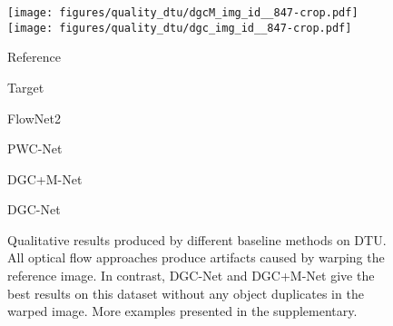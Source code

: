 \documentclass[10pt,twocolumn,letterpaper]{article}
\newcommand{\mpage}[2]
{
\begin{minipage}{#1\linewidth}\centering
#2
\end{minipage}
}
\begin{document}
\begin{figure*}[t!]
    \texttt{[image: figures/quality\_dtu/dgcM\_img\_id\_\_847-crop.pdf]}
    \texttt{[image: figures/quality\_dtu/dgc\_img\_id\_\_847-crop.pdf]}
    \vspace{0.3mm}
\small{
\hfill
\mpage{0.100}{Reference} \hfill
\mpage{0.100}{Target} \hfill
\mpage{0.100}{FlowNet2~\cite{FlowNet2}} \hfill
\mpage{0.100}{PWC-Net~\cite{PWC-Net}} \hfill
\mpage{0.100}{DGC+M-Net} \hfill
\mpage{0.100}{DGC-Net} \hfill
}
\vspace{0pt}\caption{Qualitative results produced by different baseline methods on DTU. All optical flow approaches produce artifacts caused by warping the reference image. In contrast, DGC-Net and DGC+M-Net give the best results on this dataset without any object duplicates in the warped image. More examples presented in the supplementary. }\label{fig:comparison_dtu_qual}
\end{figure*}



{\small


}

\end{document}
